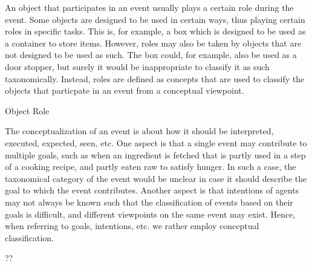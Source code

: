 An object that participates in an event usually plays a certain role during the event.
Some objects are designed to be used in certain ways, thus playing certain roles in specific tasks.
This is, for example, a box which is designed to be used as a container to store items.
However, roles may also be taken by objects that are not designed to be used as such.
The box could, for example, also be used as a door stopper, but surely it would be
inappropriate to classify it as such taxonomically.
Instead, roles are defined as concepts that are used to classify the objects that particpate in an event from a conceptual viewpoint.

\begin{ODP}{Object Role}
\end{ODP}

The conceptualization of an event is about how it should be interpreted, executed, expected, seen, etc.
One aspect is that a single event may contribute to multiple goals, such as when an ingredient is fetched that is partly used in a step of a cooking recipe, and partly eaten raw to satisfy hunger.
In such a case, the taxonomical category of the event would be unclear in case it should describe the goal to which the event contributes.
Another aspect is that intentions of agents may not always be known such that the classification of events based on their goals is difficult, and different viewpoints on the same event may exist.
Hence, when referring to goals, intentions, etc. we rather employ conceptual classification.

\begin{ODP}{??}
\end{ODP}

